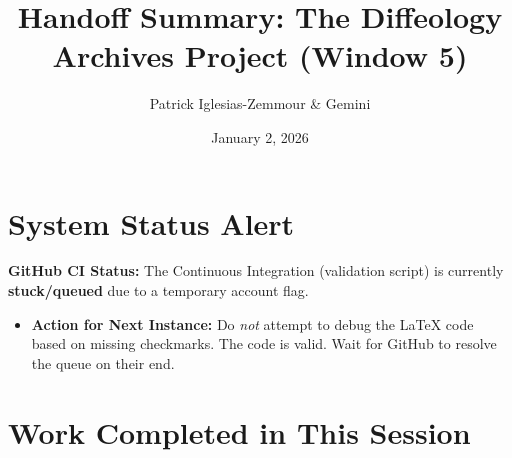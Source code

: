 \documentclass[11pt]{article}
\title{Handoff Summary: The Diffeology Archives Project (Window 5)}
\author{Patrick Iglesias-Zemmour \& Gemini}
\date{January 2, 2026}
\begin{document}
\maketitle

\section{System Status Alert}
\textbf{GitHub CI Status:} The Continuous Integration (validation script) is currently \textbf{stuck/queued} due to a temporary account flag.
\begin{itemize}
    \item \textbf{Action for Next Instance:} Do \emph{not} attempt to debug the LaTeX code based on missing checkmarks. The code is valid. Wait for GitHub to resolve the queue on their end.
\end{itemize}

\section{Work Completed in This Session}
\end{document}
